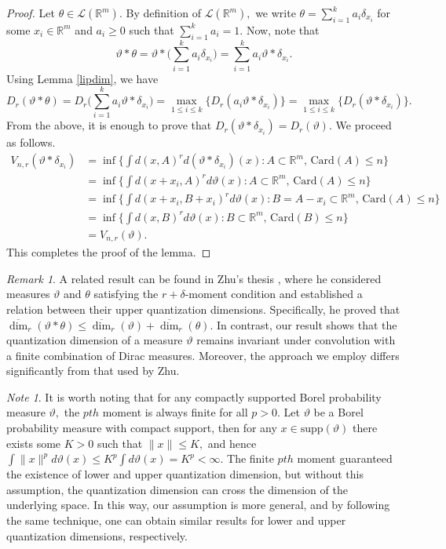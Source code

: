 \documentclass{amsproc}
\theoremstyle{definition}
\theoremstyle{remark}
\newtheorem{remark}[theorem]{Remark}
\newtheorem{note}[theorem]{Note}
\numberwithin{equation}{section}
\begin{document}
  \begin{proof}
   Let $\theta \in \mathcal{L}(\mathbb{R}^m).$ By definition of $\mathcal{L}(\mathbb{R}^m),$ we write $\theta= \sum_{i=1}^k a_i \delta_{x_i}$ for some $x_i \in \mathbb{R}^m$ and $a_i \ge 0$ such that $\sum_{i=1}^k a_i=1.$ Now, note that
    \[
    \vartheta*\theta=\vartheta *\Big(\sum_{i=1}^k a_i \delta_{x_i}\Big)= \sum_{i=1}^k a_i \vartheta*\delta_{x_i}.
    \]
    Using Lemma \ref{lipdim}, we have 
    \[
    D_r(\vartheta*\theta)=D_r\Big(\sum_{i=1}^k a_i \vartheta*\delta_{x_i}\Big)= \max_{1\le i\le k}\{D_r(a_i \vartheta*\delta_{x_i})\}=\max_{1\le i\le k}\{D_r(\vartheta*\delta_{x_i})\}.
    \]
    From the above, it is enough to prove that $D_r(\vartheta*\delta_{x_i})= D_r(\vartheta).$ We proceed as follows.
    \begin{equation*}
    \begin{aligned}
    V_{n,r}(\vartheta*\delta_{x_i}) & =  \inf \Big\{\int d(x, A)^r d(\vartheta*\delta_{x_i})(x): A \subset \mathbb{R}^m, \, \text{Card}(A) \le n\Big\}\\
    & =  \inf \Big\{\int d(x+x_i, A)^r d\vartheta(x): A \subset \mathbb{R}^m, \, \text{Card}(A) \le n\Big\}\\& =  \inf \Big\{\int d(x+x_i, B+x_i)^r d\vartheta(x): B=A-x_i \subset \mathbb{R}^m, \, \text{Card}(A) \le n\Big\}\\
    & =  \inf \Big\{\int d(x, B)^r d\vartheta(x): B \subset \mathbb{R}^m, \, \text{Card}(B) \le n\Big\}\\ & = V_{n,r}(\vartheta).
    \end{aligned}
    \end{equation*}
     This completes the proof of the lemma.
  \end{proof}
  \begin{remark}
    A related result can be found in Zhu's thesis \cite{Zhu2}, where he considered measures \(\vartheta\) and \(\theta\) satisfying the \(r + \delta\)-moment condition and established a relation between their upper quantization dimensions. Specifically, he proved that
$\overline{\dim}_r(\vartheta * \theta) \le \overline{\dim}_r(\vartheta) + \overline{\dim}_r(\theta).$ In contrast, our result shows that the quantization dimension of a measure \(\vartheta\) remains invariant under convolution with a finite combination of Dirac measures. Moreover, the approach we employ differs significantly from that used by Zhu.
  \end{remark}
  \begin{note}
      It is worth noting that for any compactly supported Borel probability measure $\vartheta,$ the $pth$ moment is always finite for all $p>0.$ Let $\vartheta$ be a Borel probability measure with compact support, then for any $x \in \text{supp}(\vartheta)$ there exists some $K >0$ such that $\|x\| \le K,$ and hence $\int \|x\|^p d\vartheta(x) \le K^p \int d \vartheta(x)= K^p < \infty.$  The finite $pth$ moment guaranteed the existence of lower and upper quantization dimension, but without this assumption, the quantization dimension can cross the dimension of the underlying space. In this way, our assumption is more general, and by following the same technique, one can obtain similar results for lower and upper quantization dimensions, respectively.
  \end{note}
\end{document}
